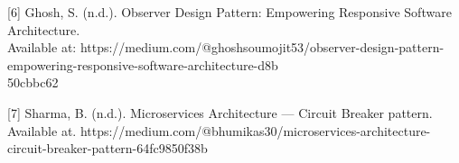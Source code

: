 \documentclass[conference, onecolumn]{IEEEtran}
\begin{document}
[6] Ghosh, S. (n.d.). Observer Design Pattern: Empowering Responsive Software Architecture.\\
Available at:  https://medium.com/@ghoshsoumojit53/observer-design-pattern-empowering-responsive-software-architecture-d8b\\
50cbbc62

[7] Sharma, B. (n.d.). Microservices Architecture — Circuit Breaker pattern.\\
Available at. https://medium.com/@bhumikas30/microservices-architecture-circuit-breaker-pattern-64fc9850f38b

\vspace{12pt}
\end{document}
